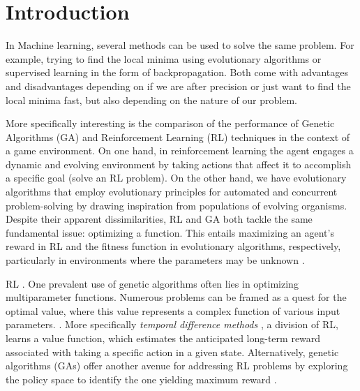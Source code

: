 \section{Introduction}



In Machine learning, several methods can be used to solve the same problem. For example, trying to find the local minima using evolutionary algorithms or supervised learning in the form of backpropagation. Both come with advantages and disadvantages depending on if we are after precision or just want to find the local minima fast, but also depending on the nature of our problem.

More specifically interesting is the comparison of the performance of Genetic Algorithms (GA) and Reinforcement Learning (RL) techniques in the context of a game environment. On one hand, in reinforcement learning the agent engages a dynamic and evolving environment by taking actions that affect it to accomplish a specific goal (solve an RL problem). On the other hand, we have evolutionary algorithms that employ evolutionary principles for automated and concurrent problem-solving by drawing inspiration from populations of evolving organisms. Despite their apparent dissimilarities, RL and GA both tackle the same fundamental issue: optimizing a function. This entails maximizing an agent's reward in RL and the fitness function in evolutionary algorithms, respectively, particularly in environments where the parameters may be unknown \cite{drugan2019reinforcement}.  

RL . One prevalent use of genetic algorithms often lies in optimizing multiparameter functions. Numerous problems can be framed as a quest for the optimal value, where this value represents a complex function of various input parameters. \cite{forrest1996genetic}. More specifically \textit{temporal difference methods} , a division of RL,  learns a value function, which estimates the anticipated long-term reward associated with taking a specific action in a given state. Alternatively, genetic algorithms (GAs) offer another avenue for addressing RL problems by exploring the policy space to identify the one yielding maximum reward \cite{taylor2006comparing}. 

